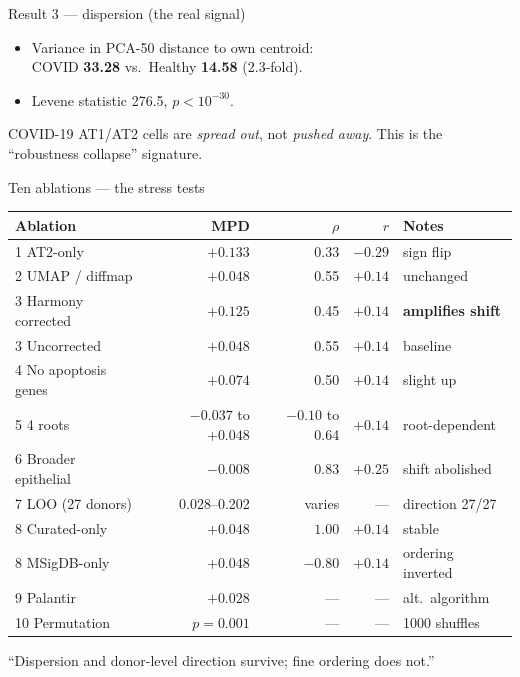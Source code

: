 \documentclass[aspectratio=169]{beamer}
\begin{document}
\begin{frame}{Result 3 --- dispersion (the real signal)}
\begin{itemize}
  \item Variance in PCA-50 distance to own centroid:\\
        COVID \textbf{33.28} vs.\ Healthy \textbf{14.58} (2.3-fold).
  \item Levene statistic 276.5, $p < 10^{-30}$.
\end{itemize}
\alert{COVID-19 AT1/AT2 cells are \emph{spread out}, not \emph{pushed away}.}
This is the ``robustness collapse'' signature.
\end{frame}

\begin{frame}{Ten ablations --- the stress tests}
\scriptsize
\begin{tabular}{lrrr l}
\toprule
Ablation & MPD & $\rho$ & $r$ & Notes \\
\midrule
1 AT2-only              & $+0.133$ & 0.33 & $-0.29$ & sign flip \\
2 UMAP / diffmap        & $+0.048$ & 0.55 & $+0.14$ & unchanged \\
3 Harmony corrected     & $+0.125$ & 0.45 & $+0.14$ & \textbf{amplifies shift} \\
3 Uncorrected           & $+0.048$ & 0.55 & $+0.14$ & baseline \\
4 No apoptosis genes    & $+0.074$ & 0.50 & $+0.14$ & slight up \\
5 4 roots               & $-0.037$ to $+0.048$ & $-0.10$ to 0.64 & $+0.14$ & root-dependent \\
6 Broader epithelial    & $-0.008$ & 0.83 & $+0.25$ & \alert{shift abolished} \\
7 LOO (27 donors)       & 0.028--0.202 & varies & --- & direction 27/27 \\
8 Curated-only          & $+0.048$ & $1.00$ & $+0.14$ & stable \\
8 MSigDB-only           & $+0.048$ & $-0.80$ & $+0.14$ & \alert{ordering inverted} \\
9 Palantir              & $+0.028$ & --- & --- & alt.\ algorithm \\
10 Permutation          & $p=0.001$ & --- & --- & 1000 shuffles \\
\bottomrule
\end{tabular}
\normalsize
\vspace{0.5em}
``Dispersion and donor-level direction survive; fine ordering does not.''
\end{frame}
\end{document}
